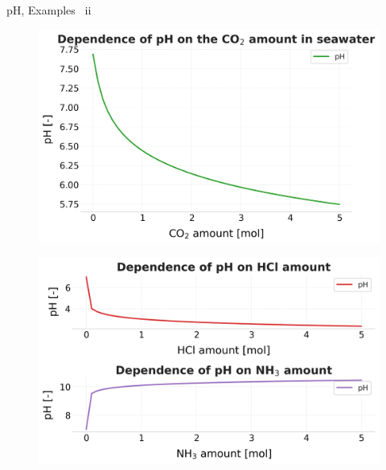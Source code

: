 \begin{frame}{pH, Examples \, ii}
\begin{itemize}
\end{itemize}
%
\rcol
\begin{figure}
\centering
\includegraphics[width=0.82\columnwidth]{figures/chemical-equilibrium/ph-dependence-on-co2-amount-in-seawater.png}
\end{figure}
\vskip -10pt
\begin{figure}
\centering
\includegraphics[width=0.82\columnwidth]{figures/chemical-equilibrium/ph-dependence-on-contaminants-in-water.png}
\end{figure}
\ecol

\end{frame}



